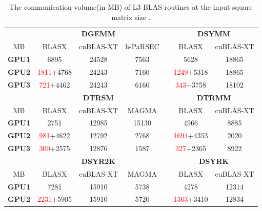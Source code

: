 \documentclass[conference]{IEEEtran}
\begin{document}
\setlength{\tabcolsep}{4.5pt}
\begin{table}[t]
\centering
\caption{The communication volume(in MB) of L3 BLAS routines at the input square matrix size .}
\label{communication_volume}
\begin{tabular}{c c c c c c c}
    \toprule
    \setlength{\tabcolsep}{1em}
    & \multicolumn{3}{c}{\textbf{DGEMM}} & & \multicolumn{2}{c}{\textbf{DSYMM}} \\
    \cline{2-4}  \cline{6-7}
    MB             &      BLASX                 &  cuBLAS-XT & h-PaRSEC  & &   BLASX                          &  cuBLAS-XT  \\  \midrule
    \textbf{GPU1}  &       6895                 &    24528   &      7563 & &   5628                           &    18865         \\
    \textbf{GPU2}  & \textcolor{red}{1811}+4768 &    24243   &      7160 & &   \textcolor{red}{1249}+5318     &    18865         \\
    \textbf{GPU3}  & \textcolor{red}{721}+4462  &    24243   &      6160 & &   \textcolor{red}{343}+3758      &    18102         \\
    \bottomrule
    & \multicolumn{3}{c}{\textbf{DTRSM}} & & \multicolumn{2}{c}{\textbf{DTRMM}} \\
    \cline{2-4}  \cline{6-7}
    MB             &      BLASX                  &  cuBLAS-XT &    MAGMA  & & BLASX                           &  cuBLAS-XT  \\  \midrule
    \textbf{GPU1}  &     2751                    &    12985   &    15130  & &   4966                          &  8885       \\
    \textbf{GPU2}  & \textcolor{red}{981}+4622   &    12792   &    2768   & &   \textcolor{red}{1694}+4353    &  2020       \\
    \textbf{GPU3}  & \textcolor{red}{300}+2575   &    12876   &    1587   & &   \textcolor{red}{327}+2365     &  8922       \\
    \bottomrule
    & \multicolumn{3}{c}{\textbf{DSYR2K}} & & \multicolumn{2}{c}{\textbf{DSYRK}} \\
    \cline{2-4}  \cline{6-7}
    MB             &      BLASX                 &  cuBLAS-XT &    MAGMA & &  BLASX                       &  cuBLAS-XT  \\  \midrule
    \textbf{GPU1}  &       7281                 &    15910   &    5738  & &   4278                       &  12314      \\
    \textbf{GPU2}  & \textcolor{red}{2231}+5905 &    15910   &    5720  & &   \textcolor{red}{1363}+3410 &  12834      \\

\end{tabular}
\end{table}
\end{document}
